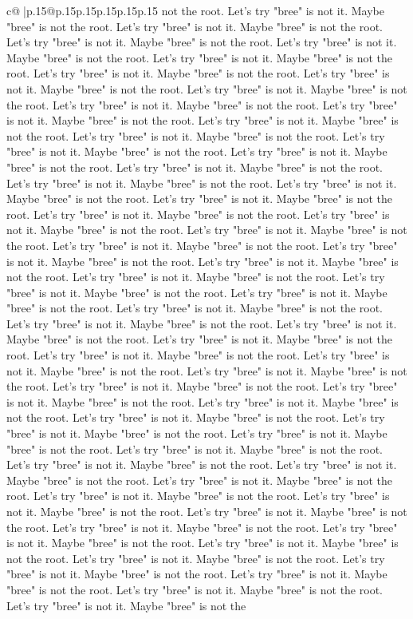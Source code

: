\documentclass{article}
\begin{document}
{\begin{supertabular}{c@{$\;$}|p{.15\linewidth}@{}p{.15\linewidth}p{.15\linewidth}p{.15\linewidth}p{.15\linewidth}p{.15\linewidth}}
{{{not the root. Let's try "bree" is not it. Maybe "bree" is not the root. Let's try "bree" is not it. Maybe "bree" is not the root. Let's try "bree" is not it. Maybe "bree" is not the root. Let's try "bree" is not it. Maybe "bree" is not the root. Let's try "bree" is not it. Maybe "bree" is not the root. Let's try "bree" is not it. Maybe "bree" is not the root. Let's try "bree" is not it. Maybe "bree" is not the root. Let's try "bree" is not it. Maybe "bree" is not the root. Let's try "bree" is not it. Maybe "bree" is not the root. Let's try "bree" is not it. Maybe "bree" is not the root. Let's try "bree" is not it. Maybe "bree" is not the root. Let's try "bree" is not it. Maybe "bree" is not the root. Let's try "bree" is not it. Maybe "bree" is not the root. Let's try "bree" is not it. Maybe "bree" is not the root. Let's try "bree" is not it. Maybe "bree" is not the root. Let's try "bree" is not it. Maybe "bree" is not the root. Let's try "bree" is not it. Maybe "bree" is not the root. Let's try "bree" is not it. Maybe "bree" is not the root. Let's try "bree" is not it. Maybe "bree" is not the root. Let's try "bree" is not it. Maybe "bree" is not the root. Let's try "bree" is not it. Maybe "bree" is not the root. Let's try "bree" is not it. Maybe "bree" is not the root. Let's try "bree" is not it. Maybe "bree" is not the root. Let's try "bree" is not it. Maybe "bree" is not the root. Let's try "bree" is not it. Maybe "bree" is not the root. Let's try "bree" is not it. Maybe "bree" is not the root. Let's try "bree" is not it. Maybe "bree" is not the root. Let's try "bree" is not it. Maybe "bree" is not the root. Let's try "bree" is not it. Maybe "bree" is not the root. Let's try "bree" is not it. Maybe "bree" is not the root. Let's try "bree" is not it. Maybe "bree" is not the root. Let's try "bree" is not it. Maybe "bree" is not the root. Let's try "bree" is not it. Maybe "bree" is not the root. Let's try "bree" is not it. Maybe "bree" is not the root. Let's try "bree" is not it. Maybe "bree" is not the root. Let's try "bree" is not it. Maybe "bree" is not the root. Let's try "bree" is not it. Maybe "bree" is not the root. Let's try "bree" is not it. Maybe "bree" is not the root. Let's try "bree" is not it. Maybe "bree" is not the root. Let's try "bree" is not it. Maybe "bree" is not the root. Let's try "bree" is not it. Maybe "bree" is not the root. Let's try "bree" is not it. Maybe "bree" is not the root. Let's try "bree" is not it. Maybe "bree" is not the root. Let's try "bree" is not it. Maybe "bree" is not the root. Let's try "bree" is not it. Maybe "bree" is not the root. Let's try "bree" is not it. Maybe "bree" is not the root. Let's try "bree" is not it. Maybe "bree" is not the root. Let's try "bree" is not it. Maybe "bree" is not the root. Let's try "bree" is not it. Maybe "bree" is not the root. Let's try "bree" is not it. Maybe "bree" is not the root. Let's try "bree" is not it. Maybe "bree" is not the root. Let's try "bree" is not it. Maybe "bree" is not the root. Let's try "bree" is not it. Maybe "bree" is not the root. Let's try "bree" is not it. Maybe "bree" is not the root. Let's try "bree" is not it. Maybe "bree" is not the }}}
\end{supertabular}}
\end{document}

